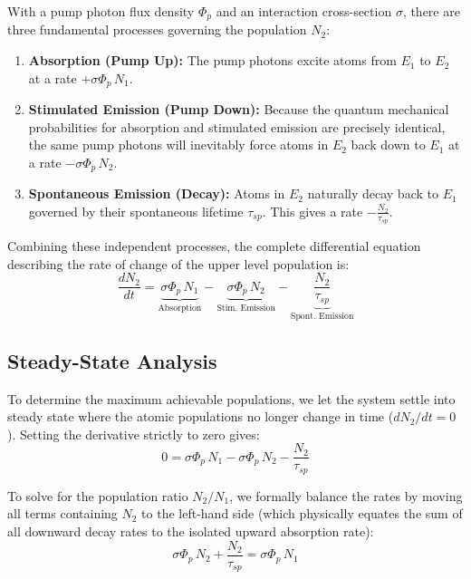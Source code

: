 With a pump photon flux density $\Phi_p$ and an interaction cross-section $\sigma$, there are three fundamental processes governing the population $N_2$:
\begin{enumerate}
    \item \textbf{Absorption (Pump Up):} The pump photons excite atoms from $E_1$ to $E_2$ at a rate $+\sigma\Phi_p\,N_1$.
    \item \textbf{Stimulated Emission (Pump Down):} Because the quantum mechanical probabilities for absorption and stimulated emission are precisely identical, the same pump photons will inevitably force atoms in $E_2$ back down to $E_1$ at a rate $-\sigma\Phi_p\,N_2$.
    \item \textbf{Spontaneous Emission (Decay):} Atoms in $E_2$ naturally decay back to $E_1$ governed by their spontaneous lifetime $\tau_{sp}$. This gives a rate $-\frac{N_2}{\tau_{sp}}$.
\end{enumerate}

Combining these independent processes, the complete differential equation describing the rate of change of the upper level population is:
\begin{equation*}
    \frac{dN_2}{dt} = \underbrace{\sigma\Phi_p\,N_1}_{\text{Absorption}} - \underbrace{\sigma\Phi_p\,N_2}_{\text{Stim. Emission}} - \underbrace{\frac{N_2}{\tau_{sp}}}_{\text{Spont. Emission}}
\end{equation*}

\subsection{Steady-State Analysis}

To determine the maximum achievable populations, we let the system settle into steady state where the atomic populations no longer change in time ($dN_2/dt = 0$). Setting the derivative strictly to zero gives:
\begin{equation*}
    0 = \sigma\Phi_p\,N_1 - \sigma\Phi_p\,N_2 - \frac{N_2}{\tau_{sp}}
\end{equation*}

To solve for the population ratio $N_2/N_1$, we formally balance the rates by moving all terms containing $N_2$ to the left-hand side (which physically equates the sum of all downward decay rates to the isolated upward absorption rate):
\begin{equation*}
    \sigma\Phi_p\,N_2 + \frac{N_2}{\tau_{sp}} = \sigma\Phi_p\,N_1
\end{equation*}

